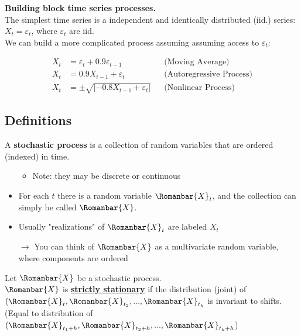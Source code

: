 \textbf{Building block time series processes.}\\


The simplest time series is a independent and identically distributed (iid.) series: $X_t = \varepsilon_t$, where $\varepsilon_t$ are iid.\\

We can build a more complicated process assuming assuming access to $\varepsilon_t$:

\begin{align*}
    X_t&= \varepsilon_t + 0.9\varepsilon_{t-1} &&\text{(Moving Average)} \\
    X_t&= 0.9X_{t-1} + \varepsilon_t &&\text{(Autoregressive Process)} \\
    X_t&= \pm \sqrt{|-0.8X_{t-1} + \varepsilon_t|} &&\text{(Nonlinear Process)}
\end{align*}

\subsection{Definitions}

A \textbf{stochastic process} is a collection of random variables that are ordered (indexed) in time.

\begin{itemize}
    \item[]
    \begin{itemize}
        \item Note: they may be discrete or continuous
    \end{itemize}
    \item For each $t$ there is a random variable $\Romanbar{X}_t$, and the collection can simply be called $\Romanbar{X}$.
    \item Usually "realizations" of $\Romanbar{X}_t$ are labeled $X_t$
    \item[$\rightarrow$] You can think of $\Romanbar{X}$ as a multivariate random variable, where components are ordered
\end{itemize}

Let $\Romanbar{X}$ be a stochastic process.\\

$\Romanbar{X}$ is \textbf{\underline{strictly stationary}} if the distribution (joint) of $(\Romanbar{X}_t, \Romanbar{X}_{t_2}, ..., \Romanbar{X}_{t_k} $ is invariant to shifts. (Equal to distribution of $(\Romanbar{X}_{t_1+h}, \Romanbar{X}_{t_2+h}, ..., \Romanbar{X}_{t_k+h} $)\\


